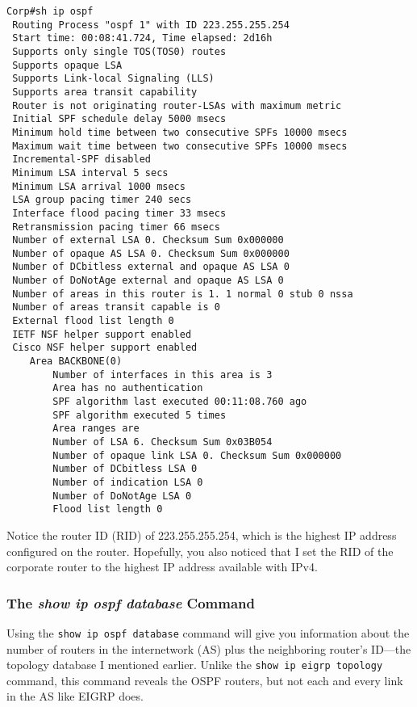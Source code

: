 \begin{verbatim}
Corp#sh ip ospf
 Routing Process "ospf 1" with ID 223.255.255.254
 Start time: 00:08:41.724, Time elapsed: 2d16h
 Supports only single TOS(TOS0) routes
 Supports opaque LSA
 Supports Link-local Signaling (LLS)
 Supports area transit capability
 Router is not originating router-LSAs with maximum metric
 Initial SPF schedule delay 5000 msecs
 Minimum hold time between two consecutive SPFs 10000 msecs
 Maximum wait time between two consecutive SPFs 10000 msecs
 Incremental-SPF disabled
 Minimum LSA interval 5 secs
 Minimum LSA arrival 1000 msecs
 LSA group pacing timer 240 secs
 Interface flood pacing timer 33 msecs
 Retransmission pacing timer 66 msecs
 Number of external LSA 0. Checksum Sum 0x000000
 Number of opaque AS LSA 0. Checksum Sum 0x000000
 Number of DCbitless external and opaque AS LSA 0
 Number of DoNotAge external and opaque AS LSA 0
 Number of areas in this router is 1. 1 normal 0 stub 0 nssa
 Number of areas transit capable is 0
 External flood list length 0
 IETF NSF helper support enabled
 Cisco NSF helper support enabled
    Area BACKBONE(0)
        Number of interfaces in this area is 3
        Area has no authentication
        SPF algorithm last executed 00:11:08.760 ago
        SPF algorithm executed 5 times
        Area ranges are
        Number of LSA 6. Checksum Sum 0x03B054
        Number of opaque link LSA 0. Checksum Sum 0x000000
        Number of DCbitless LSA 0
        Number of indication LSA 0
        Number of DoNotAge LSA 0
        Flood list length 0
\end{verbatim}

Notice the router ID (RID) of 223.255.255.254, which is the highest IP
address configured on the router. Hopefully, you also noticed that I set
the RID of the corporate router to the highest IP address available with
IPv4.

\subsubsection[The \emph{show ip ospf database}
Command]{\texorpdfstring{\protect\hypertarget{c18.xhtmlux5cux23c18-sec-13}{}{}The
\emph{show ip ospf database}
Command}{The show ip ospf database Command}}

Using the \texttt{show\ ip\ ospf\ database} command will give you
information about the number of routers in the internetwork (AS) plus
the neighboring router's ID---the topology database I mentioned earlier.
Unlike the \texttt{show\ ip\ eigrp\ topology} command, this command
reveals the OSPF routers, but not each and every link in the AS like
EIGRP does.


